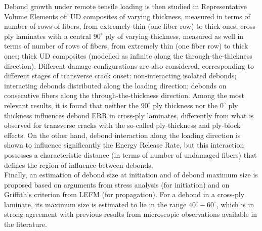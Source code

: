 Debond growth under remote tensile loading is then studied in Representative Volume Elements of: UD composites of varying thickness, measured in terms of number of rows of fibers, from extremely thin (one fiber row) to thick ones; cross-ply laminates with a central $90^{\circ}$ ply of varying thickness, measured as well in terms of number of rows of fibers, from extremely thin (one fiber row) to thick ones; thick UD composites (modelled as infinite along the through-the-thickness direction). Different damage configurations are also considered, corresponding to different stages of transverse crack onset: non-interacting isolated debonds; interacting debonds distributed along the loading direction; debonds on consecutive fibers along the through-the-thickness direction. Among the most relevant results, it is found that neither the $90^{\circ}$ ply thickness nor the $0^{\circ}$ ply thickness influences debond ERR in cross-ply laminates, differently from what is observed for transverse cracks with the so-called ply-thickness and ply-block effects. On the other hand, debond interaction along the loading direction is shown to influence significantly the Energy Release Rate, but this interaction possesses a characteristic distance (in terms of number of undamaged fibers) that defines the region of influence between debonds.\\
Finally, an estimation of debond size at initiation and of debond maximum size is proposed based on arguments from stress analysis (for initiation) and on Griffith's criterion from LEFM (for propagation). For a debond in a cross-ply laminate, its maximum size is estimated to lie in the range $40^{\circ}-60^{\circ}$, which is in strong agreement with previous results from microscopic observations available in the literature.\\